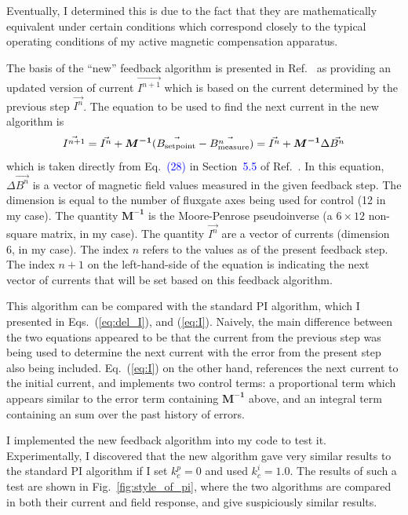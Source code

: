 Eventually, I determined this is due to the fact that they are
mathematically equivalent under certain conditions which correspond
closely to the typical operating conditions of my active magnetic
compensation apparatus.

The basis of the ``new'' feedback algorithm is presented in
Ref.~\cite{rawlik} as providing an updated version of current
$\vec{I^{n+1}}$ which is based on the current determined by the previous
step $\vec{I^n}$.  The equation to be used to find the next current in the
new algorithm is
\begin{equation}\label{eq:I_raw}
    \vec{I^{n+1}}= \vec{I^n}+\bm{M^{-1}} (\vec{B_{\rm setpoint}}-\vec{B_{\rm
    measure}^n})=\vec{I^n}+\bm{M^{-1}} \Delta \vec{B^n}
\end{equation}
which is taken directly from Eq.~\textcolor{blue}{(28)} in Section~\textcolor{blue}{5.5} of
Ref.~\cite{rawlik}. In this equation, $\Delta \vec{B^n}$ is a vector of
magnetic field values measured in the given feedback step.  The
dimension is equal to the number of fluxgate axes being used for
control (12 in my case).  The quantity $\bm{M^{-1}}$ is the Moore-Penrose
pseudoinverse (a $6\times 12$ non-square matrix, in my case).  The
quantity $\vec{I^n}$ are a vector of currents (dimension 6, in my case).
The index $n$ refers to the values as of the present feedback step.
The index $n+1$ on the left-hand-side of the equation is indicating
the next vector of currents that will be set based on this feedback
algorithm.

This algorithm can be compared with the standard PI algorithm, which I
presented in Eqs.~(\ref{eq:del_I}), and (\ref{eq:I}).  Naively, the main
difference between the two equations appeared to be that the current
from the previous step was being used to determine the next current
with the error from the present step also being included.
Eq.~(\ref{eq:I}) on the other hand, references the next current to
the initial current, and implements two control terms: a proportional
term which appears similar to the error term containing $\bm{M^{-1}}$
above, and an integral term containing an sum over the past history of
errors.


I implemented the new feedback algorithm into my code to test it.
Experimentally, I discovered that the new algorithm gave very similar
results to the standard PI algorithm if I set $k_c^p=0$ and used
$k_c^i=1.0$.  The results of such a test are shown in
Fig.~\ref{fig:style_of_pi}, where the two algorithms are compared in
both their current and field response, and give suspiciously similar
results.


